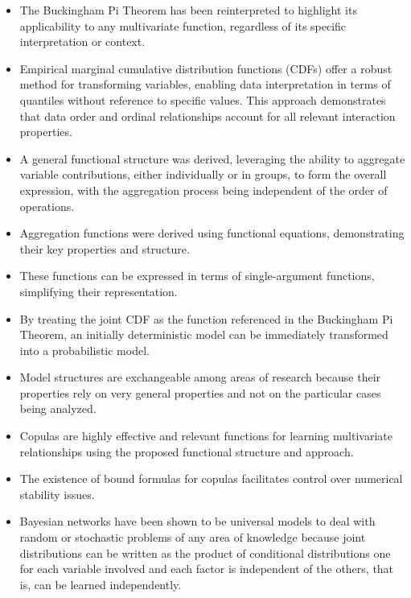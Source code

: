 \documentclass[
	11pt, %
	fleqn, %
	a4paper, %
]{LegrandOrangeBook}
\begin{document}
\begin{itemize}
\item The Buckingham Pi Theorem has been reinterpreted to highlight its applicability to any multivariate function, regardless of its specific interpretation or context.

\item Empirical marginal cumulative distribution functions (CDFs) offer a robust method for transforming variables, enabling data interpretation in terms of quantiles without reference to specific values. This approach demonstrates that data order and ordinal relationships account for all relevant interaction properties.

\item A general functional structure was derived, leveraging the ability to aggregate variable contributions, either individually or in groups, to form the overall expression, with the aggregation process being independent of the order of operations.

\item Aggregation functions were derived using functional equations, demonstrating their key properties and structure.

\item These functions can be expressed in terms of single-argument functions, simplifying their representation.

\item By treating the joint CDF as the function referenced in the Buckingham Pi Theorem, an initially deterministic model can be immediately transformed into a probabilistic model.

\item Model structures are exchangeable among areas of research because their properties rely on very general properties and not on the particular cases being analyzed.

\item Copulas are highly effective and relevant functions for learning multivariate relationships using the proposed functional structure and approach.

\item The existence of bound formulas for copulas facilitates control over numerical stability issues.

\item Bayesian networks have been shown to be universal models to deal with random or stochastic problems of any area of knowledge because joint distributions can be written as the product of conditional distributions one for each variable involved and each factor is independent of the others, that is, can be learned independently.


\end{itemize}
\end{document}
